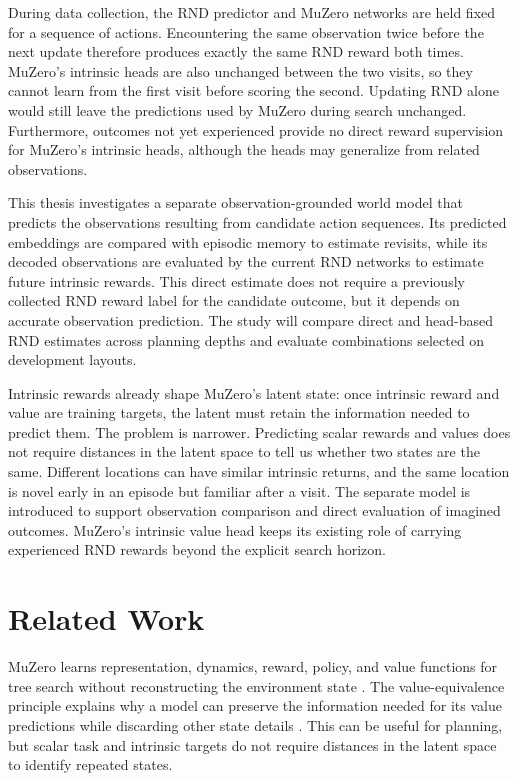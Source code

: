 \documentclass{article}
\begin{document}
During data collection, the RND predictor and MuZero networks are held fixed
for a sequence of actions. Encountering the same observation twice before the
next update therefore produces exactly the same RND reward both times.
MuZero's intrinsic heads are also unchanged between the two visits, so they
cannot learn from the first visit before scoring the second. Updating RND alone
would still leave the predictions used by MuZero during search unchanged.
Furthermore, outcomes not yet experienced provide no direct reward supervision
for MuZero's intrinsic heads, although the heads may generalize from related
observations.

This thesis investigates a separate observation-grounded world model that
predicts the observations resulting from candidate action sequences. Its
predicted embeddings are compared with episodic memory to estimate revisits,
while its decoded observations are evaluated by the current RND networks to
estimate future intrinsic rewards. This direct estimate does not require a
previously collected RND reward label for the candidate outcome, but it depends
on accurate observation prediction. The study will compare direct and
head-based RND estimates across planning depths and evaluate combinations
selected on development layouts.

Intrinsic rewards already shape MuZero's latent state: once intrinsic reward
and value are training targets, the latent must retain the information needed
to predict them. The problem is narrower. Predicting scalar rewards and values
does not require distances in the latent space to tell us whether two states
are the same. Different locations can have similar intrinsic returns, and the
same location is novel early in an episode but familiar after a visit. The
separate model is introduced to support observation comparison and direct
evaluation of imagined outcomes. MuZero's intrinsic value head keeps its
existing role of carrying experienced RND rewards beyond the explicit search
horizon.

\section{Related Work}

MuZero learns representation, dynamics, reward, policy, and value functions
for tree search without reconstructing the environment state \citep{muzero}.
The value-equivalence principle explains why a model can preserve the
information needed for its value predictions while discarding other state
details \citep{value-equivalence}. This can be useful for planning, but scalar
task and intrinsic targets do not require distances in the latent space to
identify repeated states.
\end{document}
